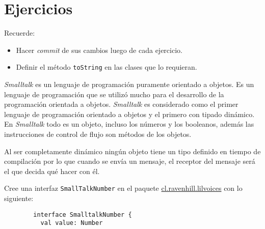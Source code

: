 \section{Ejercicios}
  \begin{important}
    Recuerde:
    \begin{itemize}
      \item Hacer \textit{commit} de sus cambios luego de cada ejercicio.
      \item Definir el método \texttt{toString} en las clases que lo requieran.
    \end{itemize}
  \end{important}

  \begin{Exercise}
    \textit{Smalltalk} es un lenguaje de programación puramente orientado a objetos.
    Es un lenguaje de programación que se utilizó mucho para el desarrollo de la programación 
    orientada a objetos.
    \textit{Smalltalk} es considerado como el primer lenguaje de programación orientado a objetos y
    el primero con tipado dinámico.
    En \textit{Smalltalk} todo es un objeto, incluso los números y los booleanos, además las 
    instrucciones de control de flujo son métodos de los objetos.

    Al ser completamente dinámico ningún objeto tiene un tipo definido en tiempo de compilación por
    lo que cuando se envía un mensaje, el receptor del mensaje será el que decida qué hacer con él.

    \Question Cree una interfaz \texttt{SmallTalkNumber} en el paquete \url{cl.ravenhill.lilvoices}
      con lo siguiente:
      \begin{verbatim}
        interface SmalltalkNumber {
          val value: Number


\end{verbatim}
\end{Exercise}
